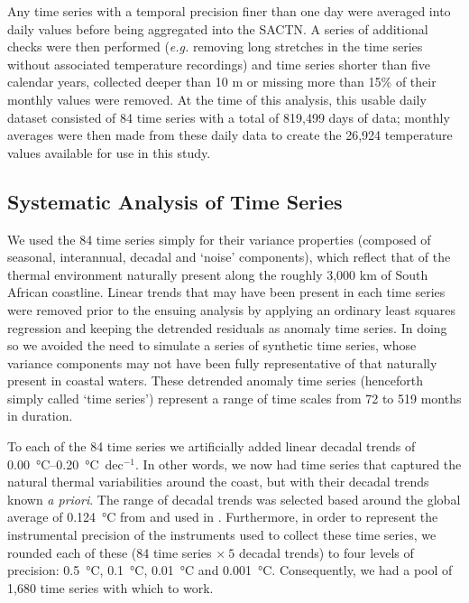 \documentclass[twocol]{ametsoc}
\begin{document}
Any time series with a temporal precision finer than one day were averaged into daily values before being aggregated into the SACTN. A series of additional checks were then performed (\emph{e.g.} removing long stretches in the time series without associated temperature recordings) and time series shorter than five calendar years, collected deeper than 10 m or missing more than 15\% of their monthly values were removed. At the time of this analysis, this usable daily dataset consisted of 84 time series with a total of 819,499 days of data; monthly averages were then made from these daily data to create the 26,924 temperature values available for use in this study.

\subsection{Systematic Analysis of Time Series}
We used the 84 time series simply for their variance properties (composed of seasonal, interannual, decadal and ‘noise’ components), which reflect that of the thermal environment naturally present along the roughly 3,000 km of South African coastline. Linear trends that may have been present in each time series were removed prior to the ensuing analysis by applying an ordinary least squares regression and keeping the detrended residuals as anomaly time series. In doing so we avoided the need to simulate a series of synthetic time series, whose variance components may not have been fully representative of that naturally present in coastal waters. These detrended anomaly time series (henceforth simply called `time series') represent a range of time scales from 72 to 519 months in duration.

To each of the 84 time series we artificially added linear decadal trends of \SIrange{0.00}{0.20}{\degreeCelsius}~dec$^{-1}$. In other words, we now had time series that captured the natural thermal variabilities around the coast, but with their decadal trends known \emph{a priori}. The range of decadal trends was selected based around the global average of \SI{0.124}{\degreeCelsius} from \citet{Kennedy2011} and used in \citet{IPCC2013}. Furthermore, in order to represent the instrumental precision of the instruments used to collect these time series, we rounded each of these (84 time series $\times~5$ decadal trends) to four levels of precision: \SI{0.5}{\degreeCelsius}, \SI{0.1}{\degreeCelsius}, \SI{0.01}{\degreeCelsius} and \SI{0.001}{\degreeCelsius}. Consequently, we had a pool of 1,680 time series with which to work.
\end{document}
